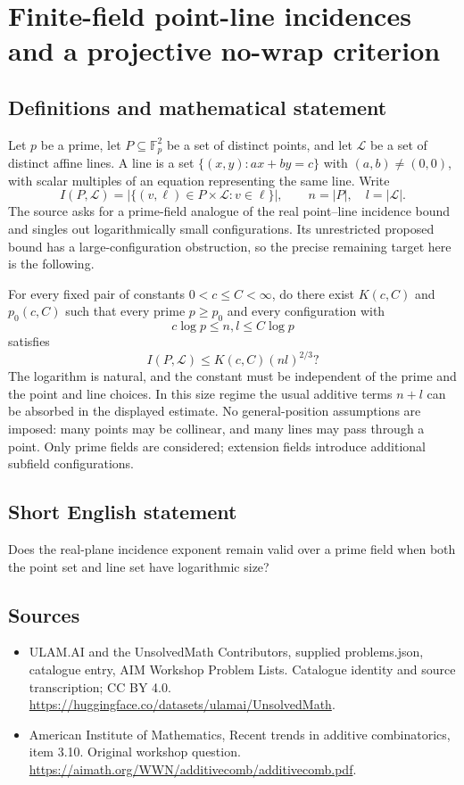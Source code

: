\documentclass[11pt,a4paper]{article}
\begin{document}
\section*{Finite-field point-line incidences and a projective no-wrap criterion}\label{statement}

\subsection{Definitions and mathematical statement}
Let $p$ be a prime, let $P\subseteq\mathbb F_p^2$ be a set of distinct points, and let $\mathcal L$ be a set of distinct affine lines.
A line is a set $\{(x,y):ax+by=c\}$ with $(a,b)\ne(0,0)$, with scalar multiples of an equation representing the same line.
Write
\[
 I(P,\mathcal L)=|\{(v,\ell)\in P\times\mathcal L:v\in\ell\}|,
 \qquad n=|P|,\quad l=|\mathcal L|.
\]
The source asks for a prime-field analogue of the real point--line incidence bound and singles out logarithmically small configurations.
Its unrestricted proposed bound has a large-configuration obstruction, so the precise remaining target here is the following.

For every fixed pair of constants $0<c\leq C<\infty$, do there exist $K(c,C)$ and $p_0(c,C)$ such that every prime $p\geq p_0$ and every configuration with
\[
 c\log p\leq n,l\leq C\log p
\]
satisfies
\[
 I(P,\mathcal L)\leq K(c,C)(nl)^{2/3}?
\]
The logarithm is natural, and the constant must be independent of the prime and the point and line choices.
In this size regime the usual additive terms $n+l$ can be absorbed in the displayed estimate.
No general-position assumptions are imposed: many points may be collinear, and many lines may pass through a point.
Only prime fields are considered; extension fields introduce additional subfield configurations.
\subsection{Short English statement}
Does the real-plane incidence exponent remain valid over a prime field when both the point set and line set have logarithmic size?
\subsection{Sources}
\begin{itemize}
\item[S1] ULAM.AI and the UnsolvedMath Contributors, supplied problems.json, catalogue entry, AIM Workshop Problem Lists. Catalogue identity and source transcription; CC BY 4.0.
\url{https://huggingface.co/datasets/ulamai/UnsolvedMath}.
\item[S2] American Institute of Mathematics, Recent trends in additive combinatorics, item 3.10. Original workshop question.
\url{https://aimath.org/WWN/additivecomb/additivecomb.pdf}.
\end{itemize}
\end{document}
